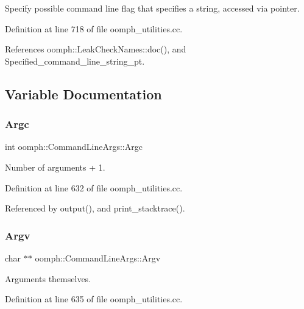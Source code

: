 Specify possible command line flag that specifies a string, accessed via pointer. 



Definition at line 718 of file oomph\+\_\+utilities.\+cc.



References oomph\+::\+Leak\+Check\+Names\+::doc(), and Specified\+\_\+command\+\_\+line\+\_\+string\+\_\+pt.



\subsection{Variable Documentation}
\mbox{\label{namespaceoomph_1_1CommandLineArgs_ab0f9a1024bd371139a86ee7db3ddfe83}} 
\subsubsection{\texorpdfstring{Argc}{Argc}}
{\footnotesize\ttfamily int oomph\+::\+Command\+Line\+Args\+::\+Argc}



Number of arguments + 1. 



Definition at line 632 of file oomph\+\_\+utilities.\+cc.



Referenced by output(), and print\+\_\+stacktrace().

\mbox{\label{namespaceoomph_1_1CommandLineArgs_a3b51290f4dc7018bba2e46bfc6f8bedc}} 
\subsubsection{\texorpdfstring{Argv}{Argv}}
{\footnotesize\ttfamily char $\ast$$\ast$ oomph\+::\+Command\+Line\+Args\+::\+Argv}



Arguments themselves. 



Definition at line 635 of file oomph\+\_\+utilities.\+cc.



